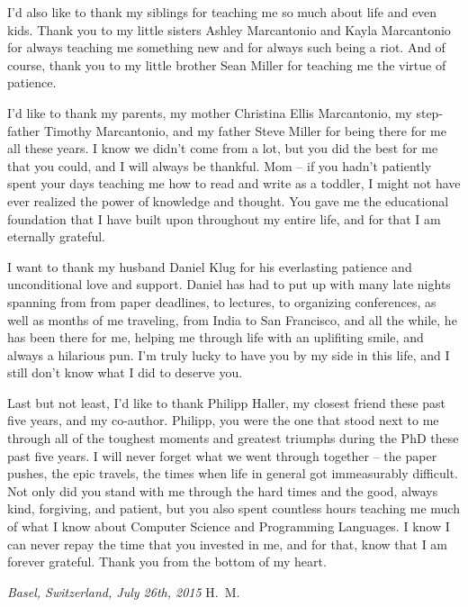\vspace{0.5cm}
I'd also like to thank my siblings for teaching me so much about life and even
kids. Thank you to my little sisters Ashley Marcantonio and Kayla Marcantonio
for always teaching me something new and for always such being a riot. And of
course, thank you to my little brother Sean Miller for teaching me the virtue of
patience.

\vspace{0.5cm}
I'd like to thank my parents, my mother Christina Ellis Marcantonio, my
step-father Timothy Marcantonio, and my father Steve Miller for being there for
me all these years. I know we didn't come from a lot, but you did the best for
me that you could, and I will always be thankful. Mom -- if you hadn't patiently
spent your days teaching me how to read and write as a toddler, I might not have
ever realized the power of knowledge and thought. You gave me the educational
foundation that I have built upon throughout my entire life, and for that I am
eternally grateful.

\vspace{0.5cm}
I want to thank my husband Daniel Klug for his everlasting patience and
unconditional love and support. Daniel has had to put up with many late nights
spanning from from paper deadlines, to lectures, to organizing conferences, as
well as months of me traveling, from India to San Francisco, and all the while,
he has been there for me, helping me through life with an uplifiting smile, and
always a hilarious pun. I'm truly lucky to have you by my side in this life, and
I still don't know what I did to deserve you.

\vspace{0.5cm}
Last but not least, I'd like to thank Philipp Haller, my closest friend these
past five years, and my co-author. Philipp, you were the one that stood next to
me through all of the toughest moments and greatest triumphs during the PhD
these past five years. I will never forget what we went through together -- the
paper pushes, the epic travels, the times when life in general got immeasurably
difficult. Not only did you stand with me through the hard times and the good,
always kind, forgiving, and patient, but you also spent countless hours teaching
me much of what I know about Computer Science and Programming Languages. I know
I can never repay the time that you invested in me, and for that, know that I am
forever grateful. Thank you from the bottom of my heart.

\bigskip

\noindent\textit{Basel, Switzerland, July 26th, 2015}
\hfill H.~M.
